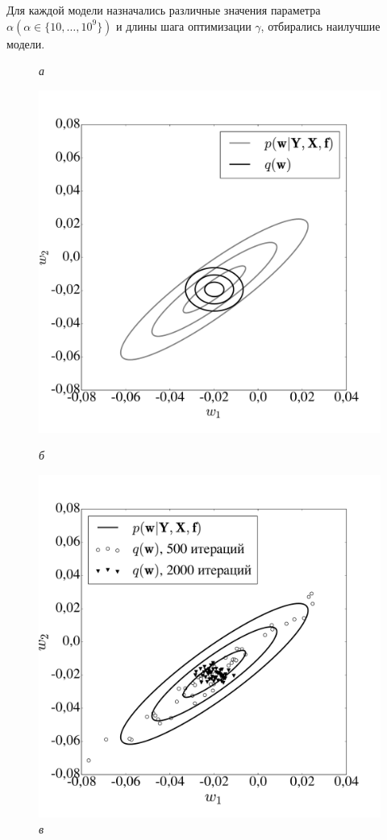 Для каждой модели назначались различные значения параметра $\alpha (\alpha \in \{10, \dots, 10^9\})$ и длины шага оптимизации $\gamma$, отбирались наилучшие модели. %
\begin{figure}[tbh!]



 \caption*{\textit{а}}
  \includegraphics[width=\linewidth]{./plots/var/mf.pdf}

\endminipage\hfill
{}
\caption*{\textit{б}}
 
  \includegraphics[width=\linewidth]{./plots/var/sgd.pdf}
 \endminipage\hfill
{}%
 \caption*{\textit{в}}


\end{figure}
